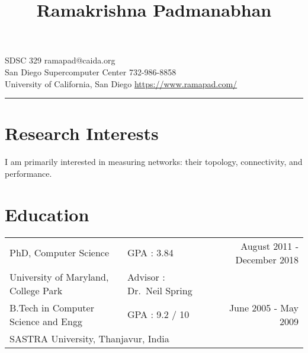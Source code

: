 \newcommand{\sect}[2]{\sectmeta{#1}{5pt}{#2} }

\newcommand{\shortsect}[2]{\sectmeta{#1}{0pt}{#2} }

\newenvironment{myitemize}
{ \begin{itemize}
    \setlength{\itemsep}{0pt}
    \setlength{\parskip}{0pt}
    \setlength{\parsep}{0pt}     }
{ \end{itemize}                  } 

\pagestyle{empty}
\title{Ramakrishna Padmanabhan}
\date{}

\maketitle
\thispagestyle{empty}
\vspace*{-12mm}
\noindent
SDSC 329 \hfill ramapad@caida.org\\
San Diego Supercomputer Center \hfill 732-986-8858\\
University of California, San Diego \hfill \href{https://www.ramapad.com/}{https://www.ramapad.com/}
\hrule



\section*{Research Interests}

I am primarily interested in measuring networks: their topology, connectivity, and performance.


\section*{Education}
\begin{tabular}{l p{5.3cm} r}
  PhD, Computer Science & GPA : 3.84 & August 2011 - December 2018 \\
  \vspace{0.35cm}
  University of Maryland, College Park & Advisor : Dr.~Neil Spring&\\

  B.Tech in Computer Science and Engg & GPA : 9.2 / 10 & \hspace{2cm} June 2005 - May 2009 \\
	\multicolumn{2}{l}{SASTRA University, Thanjavur, India}& 
\end{tabular}

